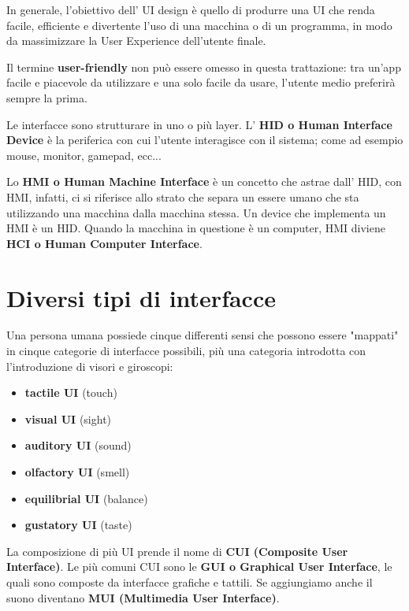 \documentclass[a4paper,11pt,oneside]{book}
\begin{document}
In generale, l'obiettivo dell' UI design è quello di produrre una UI che renda facile, efficiente e divertente l'uso di una macchina o di un programma, in modo da massimizzare la User Experience dell'utente finale.

Il termine \textbf{user-friendly} non può essere omesso in questa trattazione: tra un'app facile e piacevole da utilizzare e una solo facile da usare, l'utente medio preferirà sempre la prima.

Le interfacce sono strutturare in uno o più layer. L' \textbf{HID o Human Interface Device} è la periferica con cui l'utente interagisce con il sistema; come ad esempio mouse, monitor, gamepad, ecc...

Lo \textbf{HMI o Human Machine Interface} è un concetto che astrae dall' HID, con HMI, infatti, ci si riferisce allo strato che separa un essere umano che sta utilizzando una macchina dalla macchina stessa. Un device che implementa un HMI è un HID. Quando la macchina in questione è un computer, HMI diviene \textbf{HCI o Human Computer Interface}.

\section{Diversi tipi di interfacce}
Una persona umana possiede cinque differenti sensi che possono essere "mappati" in cinque categorie di interfacce possibili, più una categoria introdotta con l'introduzione di visori e giroscopi:
\begin{itemize}
	\item \textbf{tactile UI} (touch)
	\item \textbf{visual UI} (sight)
	\item \textbf{auditory UI} (sound)
	\item \textbf{olfactory UI} (smell)
	\item \textbf{equilibrial UI} (balance)
	\item \textbf{gustatory UI} (taste)
\end{itemize}
La composizione di più UI prende il nome di \textbf{CUI (Composite User Interface)}.
Le più comuni CUI sono le \textbf{GUI o Graphical User Interface}, le quali sono composte da interfacce grafiche e tattili. Se aggiungiamo anche il suono diventano \textbf{MUI (Multimedia User Interface)}.

\pagebreak
\end{document}

